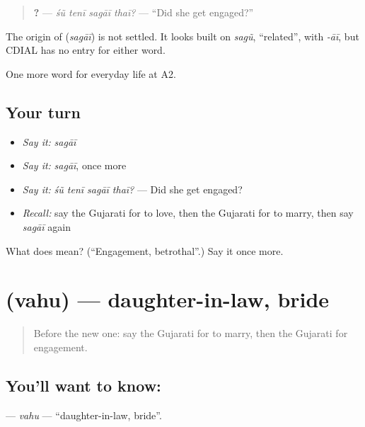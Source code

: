 \begin{quote}
\textbf{   ?} — \emph{śũ tenī sagāī thaī?} — \textquotedblleft{}Did she get engaged?\textquotedblright{}
\end{quote}

\begin{cousinweb}
The origin of \textbf{} (\emph{sagāī}) is not settled. It looks built on \emph{sagũ}, \textquotedblleft{}related\textquotedblright{}, with \emph{-āī}, but CDIAL has no entry for either word.
\end{cousinweb}

\begin{grammarlens}[title={What you've built}]
One more word for everyday life at A2.
\end{grammarlens}

\subsection*{Your turn}
\begin{itemize}
\raggedright
  \item \emph{Say it:} \emph{sagāī}
  \item \emph{Say it:} \emph{sagāī}, once more
  \item \emph{Say it:} \emph{śũ tenī sagāī thaī?} — Did she get engaged?
  \item \emph{Recall:} say the Gujarati for to love, then the Gujarati for to marry, then say \emph{sagāī} again
\end{itemize}

\begin{tcolorbox}[breakable,colback=teal!4,colframe=teal!35!black,title={Before you move on}]
What does  mean? (\textquotedblleft{}Engagement, betrothal\textquotedblright{}.) Say it once more.
\end{tcolorbox}
\section[\texorpdfstring{\gu{વહુ} (vahu)}{વહુ (vahu)}]{ (vahu) — daughter-in-law, bride}

\label{lesson:GU-C265-vahu}



\begin{quote}
Before the new one: say the Gujarati for to marry, then the Gujarati for engagement.
\end{quote}

\subsection*{You'll want to know: }
\textbf{} — \emph{vahu} — \textquotedblleft{}daughter-in-law, bride\textquotedblright{}.

